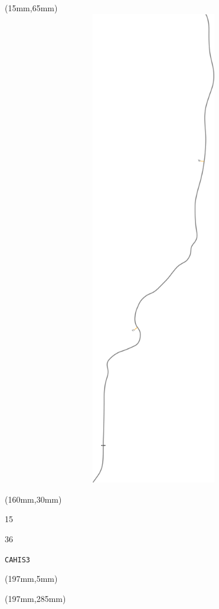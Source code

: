 \begin{textblock*}{185mm}(15mm,65mm)%
\centering
\mbox{\includegraphics[width=185mm,height=210mm,keepaspectratio]{PT/CAHIS3.pdf}}
\end{textblock*}
\begin{textblock*}{40mm}(160mm,30mm)%
\Large
\par{} 
\par15 
\par36 
\par\hfill\tiny\tt CAHIS3\\
\end{textblock*}
\begin{textblock*}{20mm}(197mm,5mm)%
\fbox{\thepage}
\label{CAHIS3}
\end{textblock*}
\begin{textblock*}{20mm}(197mm,285mm)%
\fbox{\thepage}
\end{textblock*}

